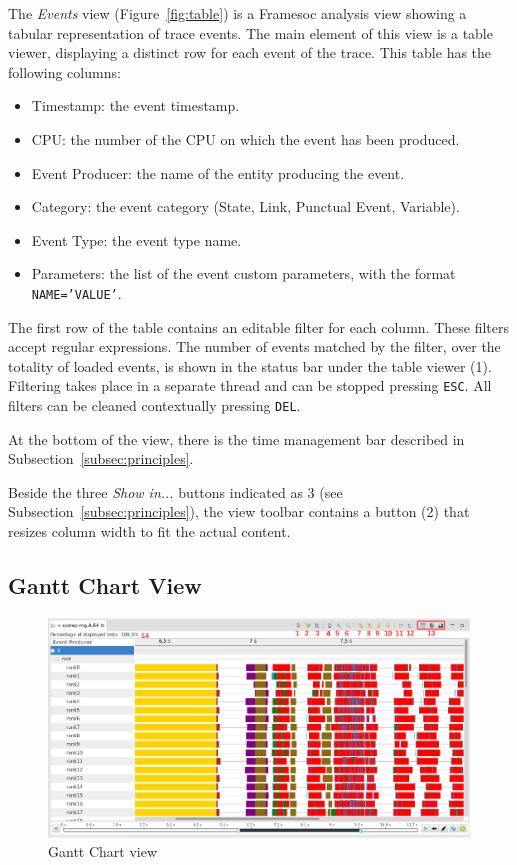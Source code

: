 \documentclass[twoside]{article}
\begin{document}
\begin{sloppypar}
The \emph{Events} view (Figure~\ref{fig:table}) is a Framesoc analysis view showing a tabular representation of trace events.
The main element of this view is a table viewer, displaying a distinct row for each event of the trace.
This table has the following columns:
\begin{itemize}
 \item Timestamp: the event timestamp.
 \item CPU: the number of the CPU on which the event has been produced.
 \item Event Producer: the name of the entity producing the event.
 \item Category: the event category (State, Link, Punctual Event, Variable).
 \item Event Type: the event type name.
 \item Parameters: the list of the event custom parameters, with the format \texttt{NAME='VALUE'}.
\end{itemize}
The first row of the table contains an editable filter for each column. 
These filters accept regular expressions.
The number of events matched by the filter, over the totality of loaded events, is shown in the status bar under the table viewer (\num{1}).
Filtering takes place in a separate thread and can be stopped pressing \texttt{ESC}. 
All filters can be cleaned contextually pressing \texttt{DEL}.

At the bottom of the view, there is the time management bar described in Subsection~\ref{subsec:principles}.

Beside the three \emph{Show in...} buttons indicated as \num{3} (see Subsection~\ref{subsec:principles}), the view toolbar contains a button (\num{2}) that resizes column width to fit the actual content.

\subsection{Gantt Chart View}
\label{subsec:gantt}

\begin{figure}[h!]
  \centering
    \includegraphics[width=1.0\textwidth]{images/gantt.pdf}
  \caption{Gantt Chart view}
  \label{fig:gantt}
\end{figure}


\end{sloppypar}
\end{document}
